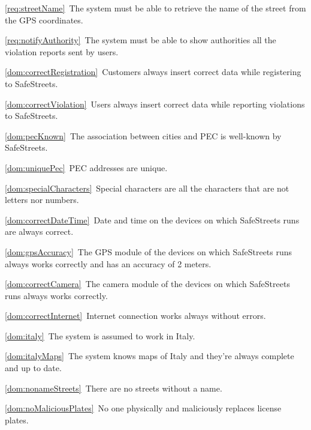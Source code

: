 \begin{description}
\begin{description}
					\item \ref{req:streetName}\ The system must be able to retrieve the name of the street from the GPS coordinates.
					\item \ref{req:notifyAuthority}\ The system must be able to show authorities all the violation reports sent by users.
					\item \ref{dom:correctRegistration}\ Customers always insert correct data while registering to SafeStreets.
					\item \ref{dom:correctViolation}\ Users always insert correct data while reporting violations to SafeStreets.
					\item \ref{dom:pecKnown}\ The association between cities and PEC is well-known by SafeStreets.
					\item \ref{dom:uniquePec}\ PEC addresses are unique.
					\item \ref{dom:specialCharacters}\ Special characters are all the characters that are not letters nor numbers.
					\item \ref{dom:correctDateTime}\ Date and time on the devices on which SafeStreets runs are always correct.
					\item \ref{dom:gpsAccuracy}\ The GPS module of the devices on which SafeStreets runs always works correctly and has an accuracy of 2 meters.
					\item \ref{dom:correctCamera}\ The camera module of the devices on which SafeStreets runs always works correctly.
					\item \ref{dom:correctInternet}\ Internet connection works always without errors.
					\item \ref{dom:italy}\ The system is assumed to work in Italy.
					\item \ref{dom:italyMaps}\ The system knows maps of Italy and they’re always complete and up to date.
					\item \ref{dom:nonameStreets}\ There are no streets without a name.
					\item \ref{dom:noMaliciousPlates}\ No one physically and maliciously replaces license plates.
				\end{description}
					

\end{description}
